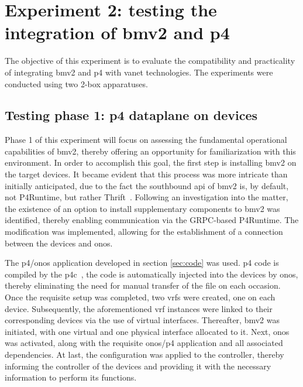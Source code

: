 \section[Experiment 2: testing the integration of BMv2 and P4]{Experiment 2: testing the integration of \gls{bmv2} and \gls{p4}}
The objective of this experiment is to evaluate the compatibility and practicality of integrating \gls{bmv2} and \gls{p4} with \gls{vanet} technologies. The experiments were conducted using two 2-box apparatuses.

\subsection[Testing phase 1: P4 dataplane on devices]{Testing phase 1: \gls{p4} dataplane on devices}

Phase 1 of this experiment will focus on assessing the fundamental operational capabilities of \gls{bmv2}, thereby offering an opportunity for familiarization with this environment. In order to accomplish this goal, the first step is installing \gls{bmv2} on the target devices. It became evident that this process was more intricate than initially anticipated, due to the fact the southbound \gls{api} of \gls{bmv2} is, by default, not P4Runtime, but rather Thrift~\cite{noauthor_apache_nodate}. Following an investigation into the matter, the existence of an option to install supplementary components to \gls{bmv2} was identified, thereby enabling communication via the GRPC-based P4Runtime. The modification was implemented, allowing for the establishment of a connection between the devices and \gls{onos}.

The \gls{p4}/\gls{onos} application developed in section \ref{sec:code} was used. \gls{p4} code is compiled by the p4c~\cite{noauthor_p4langp4c_nodate}, the code is automatically injected into the devices by \gls{onos}, thereby eliminating the need for manual transfer of the file on each occasion.
Once the requisite setup was completed, two \glspl{vrf} were created, one on each device. Subsequently, the aforementioned \gls{vrf} instances were linked to their corresponding devices via the use of virtual interfaces. Thereafter, \gls{bmv2} was initiated, with one virtual and one physical interface allocated to it. Next, \gls{onos} was activated, along with the requisite \gls{onos}/\gls{p4} application and all associated dependencies. At last, the configuration was applied to the controller, thereby informing the controller of the devices and providing it with the necessary information to perform its functions.

